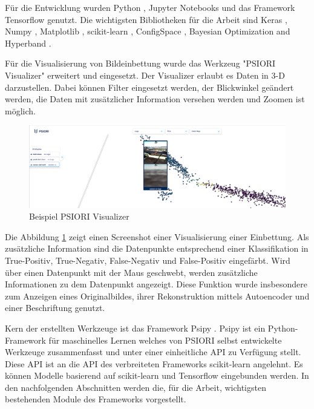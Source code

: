 	Für die Entwicklung wurden Python \cite{PythonSoftwareFoundation.2020}, Jupyter Notebooks \cite{ProjectJupyter} und das Framework Tensorflow \cite{MartinAbadi.2015}  genutzt. Die wichtigsten Bibliotheken für die Arbeit sind Keras \cite{Chollet.2015} , Numpy \cite{Oliphant.2006} , Matplotlib \cite{Hunter.2007} , scikit-learn \cite{Pedregosa.2011} , ConfigSpace \cite{Lindauer.8162019} , Bayesian Optimization and Hyperband \cite{StefanFalkner.2018}. 
	
	Für die Visualisierung von Bildeinbettung wurde das Werkzeug "PSIORI Visualizer" erweitert und eingesetzt. Der Visualizer erlaubt es Daten in 3-D darzustellen. Dabei können Filter eingesetzt werden, der Blickwinkel geändert werden, die Daten mit zusätzlicher Information versehen werden und Zoomen ist möglich.

	\begin{figure}[h]
		\centering
		\includegraphics[width=1\textwidth, center]{bilder/Grundlagen/Example_Visualizer.png}
		\caption[Beispiel PSIORI Visualizer]{Beispiel PSIORI Visualizer}
		\label{img:ExampleVisualizer}
	\end{figure}  
	Die Abbildung   \ref{img:ExampleVisualizer} zeigt einen Screenshot einer Visualisierung einer Einbettung. Als zusätzliche Information sind die Datenpunkte entsprechend einer Klassifikation in True-Positiv, True-Negativ, False-Negativ und False-Positiv eingefärbt. Wird über einen Datenpunkt mit der Maus geschwebt, werden zusätzliche Informationen zu dem Datenpunkt angezeigt. Diese Funktion wurde insbesondere zum Anzeigen eines Originalbildes, ihrer Rekonstruktion mittels Autoencoder und einer Beschriftung genutzt. 
	
	Kern der erstellten Werkzeuge ist das Framework  Psipy \cite{PSIORIGmbH.2019}. Psipy ist ein Python-Framework für maschinelles Lernen welches von PSIORI selbst entwickelte Werkzeuge zusammenfasst und unter einer einheitliche API zu Verfügung stellt. Diese API ist an die API des verbreiteten Frameworks scikit-learn angelehnt. Es können Modelle basierend auf scikit-learn  und Tensorflow eingebunden werden. In den nachfolgenden Abschnitten werden die, für die Arbeit, wichtigsten bestehenden Module des Frameworks vorgestellt.
	

